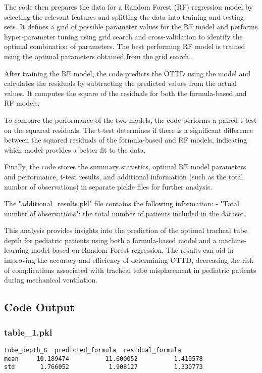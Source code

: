 \documentclass[11pt]{article}
\begin{document}
The code then prepares the data for a Random Forest (RF) regression model by selecting the relevant features and splitting the data into training and testing sets. It defines a grid of possible parameter values for the RF model and performs hyper-parameter tuning using grid search and cross-validation to identify the optimal combination of parameters. The best performing RF model is trained using the optimal parameters obtained from the grid search.

After training the RF model, the code predicts the OTTD using the model and calculates the residuals by subtracting the predicted values from the actual values. It computes the square of the residuals for both the formula-based and RF models.

To compare the performance of the two models, the code performs a paired t-test on the squared residuals. The t-test determines if there is a significant difference between the squared residuals of the formula-based and RF models, indicating which model provides a better fit to the data.

Finally, the code stores the summary statistics, optimal RF model parameters and performance, t-test results, and additional information (such as the total number of observations) in separate pickle files for further analysis.

The "additional\_results.pkl" file contains the following information: 
- "Total number of observations": the total number of patients included in the dataset.

This analysis provides insights into the prediction of the optimal tracheal tube depth for pediatric patients using both a formula-based model and a machine-learning model based on Random Forest regression. The results can aid in improving the accuracy and efficiency of determining OTTD, decreasing the risk of complications associated with tracheal tube misplacement in pediatric patients during mechanical ventilation.

\subsection{Code Output}

\subsubsection*{table\_1.pkl}

\begin{Verbatim}[tabsize=4]
      tube_depth_G  predicted_formula  residual_formula
mean     10.189474          11.600052          1.410578
std       1.766052           1.908127          1.330773
\end{Verbatim}
\end{document}
